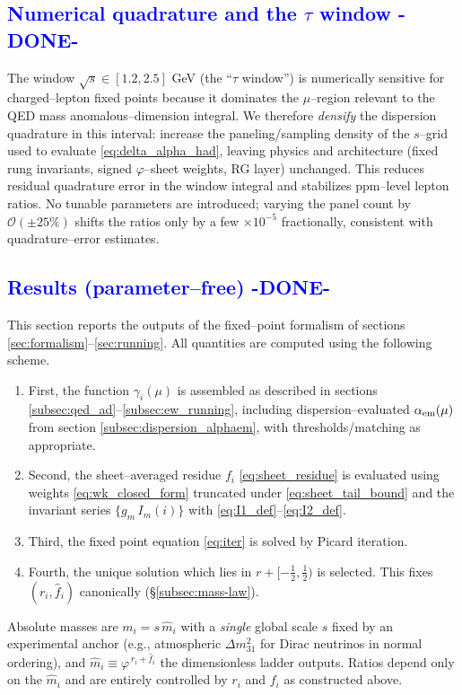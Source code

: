 \documentclass[%
 amsmath,amssymb,
 aps,
prb,
floatfix, showkeys
]{revtex4-2}
\newcommand{\modif}[1]{\textcolor{blue}{#1}}
\begin{document}
{\modif{
\subsection{Numerical quadrature and the $\tau$ window -DONE- }
\label{subsec:tau_window}
}}
The window $\sqrt{s}\in[1.2,2.5]$ GeV (the ``$\tau$ window'') is numerically sensitive
for charged–lepton fixed points because it dominates the $\mu$–region relevant to the
QED mass anomalous–dimension integral. We therefore \emph{densify} the dispersion quadrature
in this interval: increase the paneling/sampling density of the $s$–grid used to
evaluate \eqref{eq:delta_alpha_had}, leaving physics and architecture
(fixed rung invariants, signed $\varphi$--sheet weights, RG layer) unchanged.
This reduces residual quadrature error in the window integral and stabilizes
ppm–level lepton ratios. No tunable parameters are introduced; varying the panel
count by $\mathcal{O}(\pm 25\%)$ shifts the ratios only by a few $\times 10^{-5}$
fractionally, consistent with quadrature–error estimates.











{\modif{
    \section{Results (parameter--free)   -DONE-}
\label{sec:results}
 }}
This section reports the outputs of the fixed--point formalism of
sections \ref{sec:formalism}--\ref{sec:running}. 
All quantities are computed using the following scheme.
\begin{enumerate}
\item First, the function $\gamma_i(\mu)$ is assembled
  as described in sections  \ref{subsec:qed_ad}–\ref{subsec:ew_running},
  including dispersion–evaluated $\alpha_{\rm em}(\mu)$ from section
  \ref{subsec:dispersion_alphaem}, with thresholds/matching as appropriate.
\item Second,  the sheet–averaged residue $f_i$ \eqref{eq:sheet_residue} is evaluated
  using weights \eqref{eq:wk_closed_form} truncated under \eqref{eq:sheet_tail_bound}
  and the invariant series $\{g_m\,I_m(i)\}$ with \eqref{eq:I1_def}–\eqref{eq:I2_def}.
\item Third, the fixed point equation \eqref{eq:iter} is solved by Picard iteration.
\item Fourth, the unique solution which lies in $r+[-\tfrac{1}{2},\tfrac{1}{2})$ is selected.
  This fixes $(r_i,\widehat f_i)$ canonically (\S\ref{subsec:mass-law}).
\end{enumerate}
Absolute masses are $m_i = s\,\widehat m_i$ with a \emph{single} global scale $s$ fixed by
an experimental anchor (e.g., atmospheric $\Delta m^2_{31}$ for Dirac neutrinos in normal ordering),
and $\widehat m_i\equiv \varphi^{\,r_i+\widehat f_i}$ the dimensionless ladder outputs.
Ratios depend only on the $\widehat m_i$ and are entirely controlled by $r_i$ and $f_i$ as constructed above.
\end{document}
